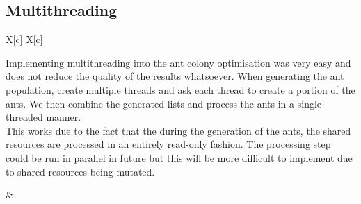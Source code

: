 \documentclass[a4paper, 11pt,table]{article}
\begin{document}
\subsection{Multithreading}
\begin{tabu}{X[c] X[c]}	
	\begin{minipage}{\linewidth}
		Implementing multithreading into the ant colony optimisation was very easy and does not reduce the quality of the results whatsoever. When generating the ant population, create multiple threads and ask each thread to create a portion of the ants. We then combine the generated lists and process the ants in a single-threaded manner.\\
		
		This works due to the fact that the during the generation of the ants, the shared resources are processed in an entirely read-only fashion. The processing step could be run in parallel in future but this will be more difficult to implement due to shared resources being mutated.
	\end{minipage}
	
	&
	\begin{minipage}{\linewidth}
	\end{minipage}
	\\
\end{tabu}
\end{document}
